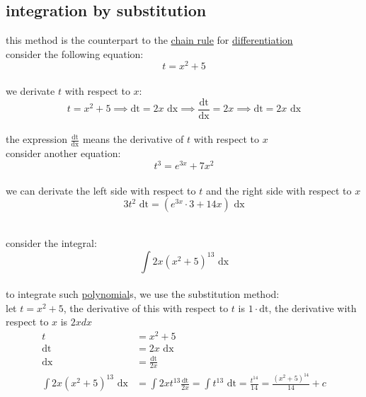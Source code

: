 \documentclass[a4paper,12pt]{article}
\newcommand{\?}{\stackrel{?}{=}}
\begin{document}
\subsection{integration by substitution}
\label{sec:orgf2294be}
\begin{definition}
this method is the counterpart to the \hyperref[sec:org9cdf5b8]{chain rule} for \hyperref[sec:org5154d31]{differentiation}\\[0pt]
consider the following equation:\\[0pt]
\[ t = x^2 + 5 \]\\[0pt]
we derivate \(t\) with respect to \(x\):\\[0pt]
\[
  t = x^2 + 5 \implies \text{dt} = 2x \text{ dx} \implies \frac{\text{dt}}{\text{dx}} = 2x \implies \text{dt} = 2x \text{ dx}
\]\\[0pt]
the expression \(\frac{\mathrm{dt}}{\mathrm{dx}}\) means the derivative of \(t\) with respect to \(x\)\\[0pt]
consider another equation:\\[0pt]
\[ t^3 = e^{3x} + 7x^2 \]\\[0pt]
we can derivate the left side with respect to \(t\) and the right side with respect to \(x\)\\[0pt]
\[ 3t^2 \text{ dt} = \left(e^{3x} \cdot 3 + 14x\right) \text{ dx} \]\\[0pt]

\begin{my_example}
consider the integral:\\[0pt]
\[ \int 2x\left(x^2+5\right)^{13} \text{ dx} \]\\[0pt]
to integrate such \hyperref[sec:orgbab33ca]{polynomial}s, we use the substitution method:\\[0pt]

let \(t = x^2 + 5\), the derivative of this with respect to \(t\) is \(1 \cdot \text{dt}\), the derivative with respect to \(x\) is \(2xdx\)\\[0pt]

\begin{align*}
  t &= x^2 + 5\\
  \text{dt} &= 2x \text{ dx}\\
  \text{dx} &= \frac{\text{dt}}{2x}\\
  \int 2x\left(x^2+5\right)^{13} \text{ dx} &= \int 2xt^{13} \frac{\text{dt}}{2x} = \int t^{13} \text{ dt} = \frac{t^{14}}{14} = \frac{{(x^2+5)}^{14}}{14} + c
\end{align*}
\end{my_example}


\end{definition}
\end{document}
